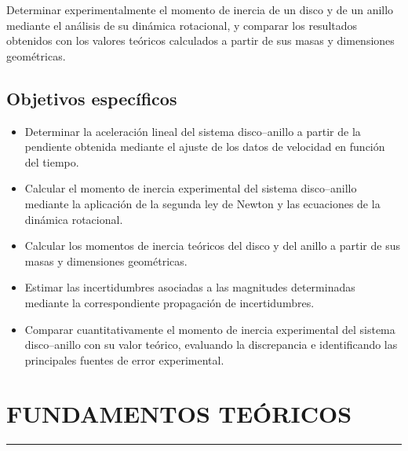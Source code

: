\documentclass[11pt,a4paper]{article}
\newcommand{\sectionline}{%
    \vspace{-0.6em}
    \noindent\rule{\textwidth}{0.5pt}
    \vspace{0.5em}
}
\begin{document}
Determinar experimentalmente el momento de inercia de un disco y de un
anillo mediante el análisis de su dinámica rotacional, y comparar los
resultados obtenidos con los valores teóricos calculados a partir de sus
masas y dimensiones geométricas.

\subsection*{Objetivos específicos}

\begin{itemize}

    \item Determinar la aceleración lineal del sistema disco--anillo a
    partir de la pendiente obtenida mediante el ajuste de los datos de
    velocidad en función del tiempo.

    \item Calcular el momento de inercia experimental del sistema
    disco--anillo mediante la aplicación de la segunda ley de Newton y
    las ecuaciones de la dinámica rotacional.

    \item Calcular los momentos de inercia teóricos del disco y del
    anillo a partir de sus masas y dimensiones geométricas.

    \item Estimar las incertidumbres asociadas a las magnitudes
    determinadas mediante la correspondiente propagación de
    incertidumbres.

    \item Comparar cuantitativamente el momento de inercia experimental
    del sistema disco--anillo con su valor teórico, evaluando la
    discrepancia e identificando las principales fuentes de error
    experimental.

\end{itemize}



\newpage

\section*{FUNDAMENTOS TEÓRICOS}
\sectionline


\end{document}
